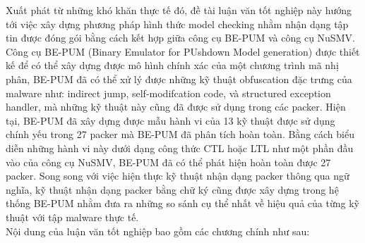 \hspace{0.5cm}Xuất phát từ những khó khăn thực tế đó, đề tài luận văn tốt nghiệp này hướng tới việc xây dựng phương pháp hình thức model checking nhằm nhận dạng tập tin được đóng gói bằng cách kết hợp giữa công cụ BE-PUM và công cụ NuSMV. Công cụ BE-PUM (Binary Emulator for PUshdown Model generation) được thiết kế để có thể xây dựng được mô hình chính xác của một chương trình mã nhị phân, BE-PUM đã có thể xử lý được những kỹ thuật obfuscation đặc trưng của malware như: indirect jump, self-modifcation code, và structured exception handler, mà những kỹ thuật này cũng đã được sử dụng trong các packer. Hiện tại, BE-PUM đã xây dựng được mẫu hành vi của 13 kỹ thuật được sử dụng chính yếu trong 27 packer mà BE-PUM đã phân tích hoàn toàn. Bằng cách biểu diễn những hành vi này dưới dạng công thức CTL hoặc LTL như một phần đầu vào của công cụ NuSMV, BE-PUM đã có thể phát hiện hoàn toàn được 27 packer. Song song với việc hiện thực kỹ thuật nhận dạng packer thông qua ngữ nghĩa, kỹ thuật nhận dạng packer bằng chữ ký cũng được xây dựng trong hệ thống BE-PUM nhằm đưa ra những so sánh cụ thể nhất về hiệu quả của từng kỹ thuật với tập malware thực tế.\\

\hspace{0.5cm}Nội dung của luận văn tốt nghiệp bao gồm các chương chính như sau:

